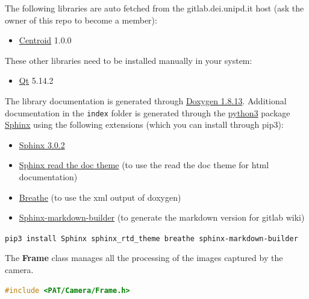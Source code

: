 
The following libraries are auto fetched from the gitlab.dei.unipd.it
host (ask the owner of this repo to become a member):

\begin{itemize}
  \tightlist
  \item
        \href{https://gitlab.dei.unipd.it/PAT/Centroid.git}{Centroid} 1.0.0
\end{itemize}

These other libraries need to be installed manually in your system:

\begin{itemize}
  \tightlist
  \item
        \href{https://www.qt.io/}{Qt} 5.14.2
\end{itemize}

The library documentation is generated through
\href{http://www.doxygen.nl/download.html}{Doxygen 1.8.13}. Additional
documentation in the \texttt{index} folder is generated through the
\href{https://www.anaconda.com/products/individual}{python3} package
\href{https://www.sphinx-doc.org/en/master/}{Sphinx} using the following
extensions (which you can install through pip3):

\begin{itemize}
  \tightlist
  \item
        \href{https://pypi.org/project/Sphinx/}{Sphinx 3.0.2}
  \item
        \href{https://sphinx-rtd-theme.readthedocs.io/en/stable/}{Sphinx read
          the doc theme} (to use the read the doc theme for html documentation)
  \item
        \href{https://pypi.org/project/breathe/}{Breathe} (to use the xml
        output of doxygen)
  \item
        \href{https://pypi.org/project/sphinx-markdown-builder/}{Sphinx-markdown-builder}
        (to generate the markdown version for gitlab wiki)
\end{itemize}

\texttt{pip3\ install\ Sphinx\ sphinx\_rtd\_theme\ breathe\ sphinx-markdown-builder}



The \textbf{Frame} class manages all the processing of the images
captured by the camera.

\begin{lstlisting}[language=c++, gobble=2, caption=PAT/Camera/Frame inclusion.]
  #include <PAT/Camera/Frame.h>
\end{lstlisting}

